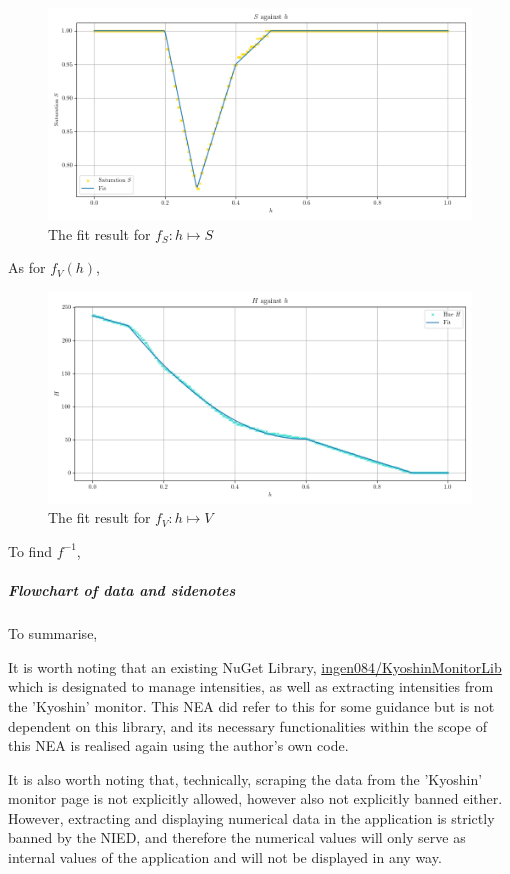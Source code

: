 \documentclass[10pt]{article}
\newcommand{\GitHubHref}[2]{\href{https://github.com/#1/#2}{\faGithub\space #1/#2}}
\begin{document}
\begin{figure}[!ht]
    \centering
    \includegraphics[scale = 0.55]{s-against-h.png}
    \caption{The fit result for \(f_S: h \mapsto S\)}
    \label{fig:s-against-h}
\end{figure}

As for \(f_V(h)\), 

\begin{figure}[!ht]
    \centering
    \includegraphics[scale = 0.55]{v-against-h.png}
    \caption{The fit result for \(f_V: h \mapsto V\)}
    \label{fig:v-against-h}
\end{figure}

To find \(f^{-1}\),

\subparagraph{Flowchart of data and sidenotes} To summarise,

It is worth noting that an existing NuGet Library, \GitHubHref{ingen084}{KyoshinMonitorLib} which is designated to manage intensities, as well as extracting intensities from the 'Kyoshin' monitor. This NEA did refer to this for some guidance but is not dependent on this library, and its necessary functionalities within the scope of this NEA is realised again using the author's own code.

It is also worth noting that, technically, scraping the data from the 'Kyoshin' monitor page is not explicitly allowed, however also not explicitly banned either. However, extracting and displaying numerical data in the application is strictly banned by the NIED, and therefore the numerical values will only serve as internal values of the application and will not be displayed in any way.
\end{document}
